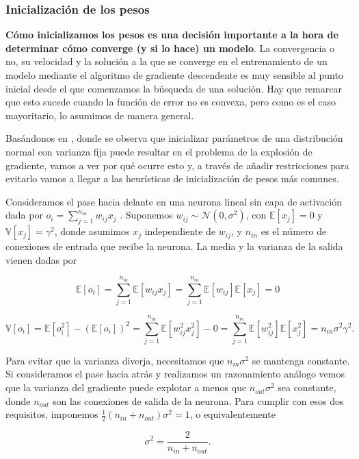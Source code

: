 \subsubsection{Inicialización de los pesos}\label{sec:inipesos}

\textbf{Cómo inicializamos los pesos es una decisión importante a la hora de determinar cómo converge (y si lo hace) un modelo}. La convergencia o no, su velocidad y la solución a la que se converge en el entrenamiento de un modelo mediante el algoritmo de gradiente descendente es muy sensible al punto inicial desde el que comenzamos la búsqueda de una solución. Hay que remarcar que esto sucede cuando la función de error no es convexa, pero como es el caso mayoritario, lo asumimos de manera general.  

Basándonos en \cite{stabilityProblem2}, donde se observa que inicializar parámetros de una distribución normal con varianza fija puede resultar en el problema de la explosión de gradiente, vamos a ver por qué ocurre esto y, a través de añadir restricciones para evitarlo vamos a llegar a las heurísticas de inicialización de pesos más comunes.

Consideramos el pase hacia delante en una neurona lineal sin capa de activación dada por $o_i = \sum_{j=1}^{n_{in}} w_{ij}x_j$ . Suponemos $w_{ij} \sim \mathcal{N}(0, \sigma^2)$, con $\mathbb{E}[x_j]=0$ y $\mathbb{V}[x_j]=\gamma^2$, donde asumimos $x_j$ independiente de $w_{ij}$, y $n_{in}$ es el número de conexiones de entrada que recibe la neurona. La media y la varianza de la salida vienen dadas por

$$\mathbb{E}[o_i]= \sum_{j=1}^{n_{in}} \mathbb{E}[w_{ij} x_j] = \sum_{j=1}^{n_{in}} \mathbb{E}[w_{ij}] \mathbb{E}[x_j]=0$$

$$\mathbb{V}[o_i] = \mathbb{E}[o_i^2] - (\mathbb{E}[o_i])^2 = \sum_{j=1}^{n_{in}} \mathbb{E}[w_{ij}^2x_j^2] - 0 = \sum_{j=1}^{n_{in}} \mathbb{E}[w_{ij}^2] \mathbb{E}[x_j^2] = n_{in} \sigma^2 \gamma^2.$$

Para evitar que la varianza diverja, necesitamos que $n_{in} \sigma^2$ se mantenga constante. Si consideramos el pase hacia atrás y realizamos un razonamiento análogo vemos que la varianza del gradiente puede explotar a menos que $n_{out} \sigma^2$ sea constante, donde $n_{out}$ son las conexiones de salida de la neurona. Para cumplir con esos dos requisitos, imponemos $\frac{1}{2}(n_{in}+n_{out}) \sigma^2 = 1$, o equivalentemente

$$\sigma^2= \frac{2}{n_{in}+n_{out}}.$$

